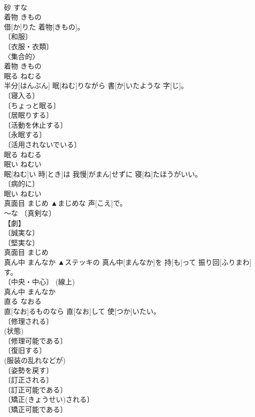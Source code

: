 \documentclass[8pt]{extreport}
\begin{document}
\begin{CJK}{UTF8}{min}
\\	砂	すな	
\\	着物	きもの	
\\	借[か]りた 着物[きもの]。	
\\	〔和服〕 
\\	〔衣服・衣類〕 
\\	〈集合的〉 
\\	[⇒ふく１]	着物	きもの	
\\	眠る	ねむる	
\\	半分[はんぶん] 眠[ねむ]りながら 書[か]いたような 字[じ]。	
\\	〔寝入る〕 
\\	〔ちょっと眠る〕 
\\	〔居眠りする〕 
\\	〔活動を休止する〕 
\\	〔永眠する〕 
\\	〔活用されないでいる〕 
\\	眠る	ねむる	
\\	眠い	ねむい	
\\	眠[ねむ]い 時[とき]は 我慢[がまん]せずに 寝[ね]たほうがいい。	
\\	〔病的に〕 
\\	眠い	ねむい	
\\	真面目	まじめ	▲まじめな 声[こえ]で。	
\\	～な 〔真剣な〕 
\\	【劇】 
\\	〔誠実な〕 
\\	〔堅実な〕 
\\	真面目	まじめ	
\\	真ん中	まんなか	▲ステッキの 真ん中[まんなか]を 持[も]って 振り回[ふりまわ]す。	
\\	〔中央・中心〕 (線上) 
\\	真ん中	まんなか	
\\	直る	なおる	
\\	直[なお]るものなら 直[なお]して 使[つか]いたい。	
\\	〔修理される〕 
\\	(状態) 
\\	〔修理可能である〕 
\\	〔復旧する〕 
\\	(服装の乱れなどが) 
\\	〔姿勢を戻す〕 
\\	〔訂正される〕 
\\	〔訂正可能である〕 
\\	〔矯正(きょうせい)される〕 
\\	〔矯正可能である〕 

\end{CJK}
\end{document}
